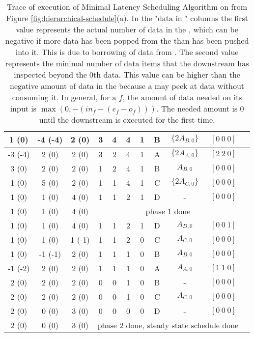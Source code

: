 \begin{table}
\begin{tabular}{|c|c|c|c|c|c|c|c|c|c|c|}
\hline 1 (0) & -4 (-4) & 2 (0) & 3 & 4 & 4 & 1 & B & $\{2 A_{B,0}\}$ & $[0\ 0\ 0]$ \\
\hline -3 (-4) & 2 (0) & 2 (0) & 3 & 2 & 4 & 1 & A & $\{2 A_{A,0}\}$ & $[2\ 2\ 0]$ \\
\hline 3 (0) & 2 (0) & 2 (0) & 1 & 2 & 4 & 1 & B & $A_{B,0}$ & $[0\ 0\ 0]$ \\
\hline 1 (0) & 5 (0) & 2 (0) & 1 & 1 & 4 & 1 & C & $\{2 A_{C,0}\}$ & $[0\ 0\ 0]$ \\
\hline 1 (0) & 1 (0) & 4 (0) & 1 & 1 & 2 & 1 & D & - & $[0\ 0\ 0]$ \\
\hline 1 (0) &  1 (0) &  4 (0) &  \multicolumn{7}{|c|}{phase 1 done} \\
\hline 1 (0) & 1 (0) & 4 (0) & 1 & 1 & 2 & 1 & D & $A_{D,0}$ & $[0\ 0\ 1]$ \\
\hline 1 (0) & 1 (0) & 1 (-1) & 1 & 1 & 2 & 0 & C & $A_{C,0}$ & $[0\ 0\ 0]$ \\
\hline 1 (0) & -1 (-1) & 2 (0) & 1 & 1 & 1 & 0 & B & $A_{B,0}$ & $[0\ 0\ 0]$ \\
\hline -1 (-2) & 2 (0) & 2 (0) & 1 & 1 & 1 & 0 & A & $A_{A,0}$ & $[1\ 1\ 0]$ \\
\hline 2 (0) & 2 (0) & 2 (0) & 0 & 0 & 1 & 0 & B & - & $[0\ 0\ 0]$ \\
\hline 2 (0) & 2 (0) & 2 (0) & 0 & 0 & 1 & 0 & C & $A_{C,0}$ & $[0\ 0\ 0]$ \\
\hline 2 (0) & 0 (0) & 3 (0) & 0 & 0 & 0 & 0 & D & - & $[0\ 0\ 0]$ \\
\hline 2 (0) &  0 (0) &  3 (0) &  \multicolumn{7}{|c|}{phase 2 done, steady state schedule done} \\
\hline
\end{tabular}
\caption[Trace of execution of Minimal Latency Scheduling on a
{\pipeline}]{Trace of execution of Minimal Latency Scheduling
Algorithm on {\pipeline} from Figure
\ref{fig:hierarchical-schedule}(a). In the "data in {{\Channel}}"
columns the first value represents the actual number of data in
the {{\Channel}}, which can be negative if more data has been popped
from the {{\Channel}} than has been pushed into it.  This is due to
borrowing of data from {\Channels}. The second value represents the
minimal number of data items that the downstream {\filter} has
inspected beyond the 0th data. This value can be higher than the
negative amount of data in the {{\Channel}} because a {\filter} may
peek at data without consuming it.  In general, for a {\filter}
$f$, the amount of data needed on its input {{\Channel}} is $\max(0,
-(in_f - (e_f - o_f)))$. The needed amount is 0 until the
downstream {\filter} is executed for the first time.}
\label{tbl:min-lat-pipe}
\end{table}

